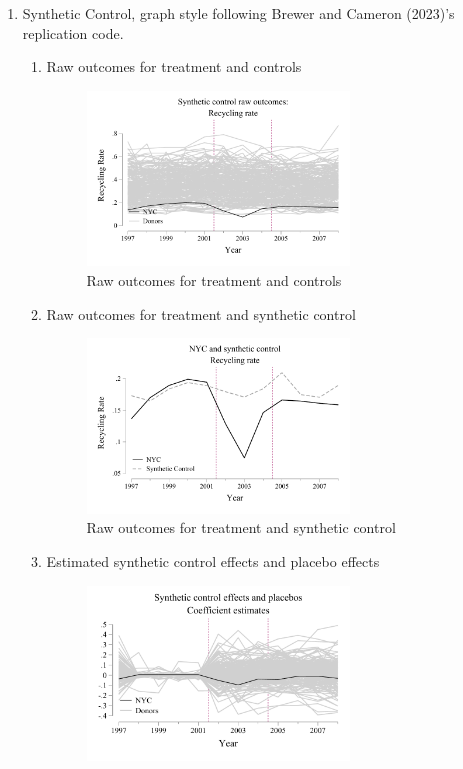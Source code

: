 \documentclass{article}
\begin{document}
\begin{enumerate}
\item Synthetic Control, graph style following Brewer and Cameron (2023)'s replication code.
\begin{enumerate}
    \item Raw outcomes for treatment and controls
    \begin{figure}[H]
        \centering
        \includegraphics[width=0.7\textwidth]{./figure/raw.pdf}
        \caption{Raw outcomes for treatment and controls}
        \label{f:raw}
    \end{figure}
    \item Raw outcomes for treatment and synthetic control
    \begin{figure}[H]
        \centering
        \includegraphics[width=0.7\textwidth]{./figure/treatmentcontrol.pdf}
        \caption{Raw outcomes for treatment and synthetic control}
        \label{f:tvsc}
    \end{figure}
    \item Estimated synthetic control effects and placebo effects
    \begin{figure}[H]
        \centering
        \includegraphics[width=0.7\textwidth]{./figure/placebo.pdf}

\end{figure}
\end{enumerate}
\end{enumerate}
\end{document}

